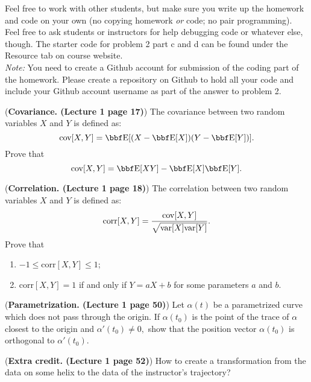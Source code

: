 \documentclass[12pt,letterpaper]{hmcpset}
\begin{document}
Feel free to work with other students, but make sure you write up the homework
and code on your own (no copying homework \textit{or} code; no pair programming).
Feel free to ask students or instructors for help debugging code or whatever else,
though.
The starter code for problem 2 part c and d can be found under the Resource tab on course website.\\

\textit{Note:} You need to create a Github account for submission of the coding part of the homework. Please create a repository on Github to hold all your code and include your Github account username as part of the answer to problem 2.

\begin{problem}[1]
(\textbf{Covariance. (Lecture 1 page 17)}) The covariance between two random variables $X$ and $Y$ is defined as:
$$
   \cov[X,Y] = \EE[(X-\EE[X])(Y-\EE[Y])].
$$
Prove that 
$$
\cov[X,Y] = \EE[XY]- \EE[X] \EE[Y].
$$
\end{problem}
\begin{solution}
    \vfill
\end{solution}
\newpage




\begin{problem}[2]
(\textbf{Correlation. (Lecture 1 page 18)}) The correlation between two random variables $X$ and $Y$ is defined as:
$$
\text{corr}[X,Y] =\frac{ {\hbox{cov}}[X,Y]}{\sqrt{{\hbox{var}}[X]{\hbox{var}}[Y]}}.
$$
Prove that 
\begin{enumerate}
\item $-1\le\text{corr}[X,Y]\le1$;
\item $\text{corr}[X,Y]=1$ if and only if $Y=aX+b$ for some parameters $a$ and $b$.
\end{enumerate}


\end{problem}
\begin{solution}
    \vfill
\end{solution}
\newpage

\begin{problem}[3]
	(\textbf{Parametrization. (Lecture 1 page 50)}) Let $\alpha(t)$ be a parametrized curve which does not pass through the origin. If $\alpha(t_0)$ is the point of the trace of $\alpha$ closest to the origin and $\alpha'(t_0)\neq0,$ show that the position vector $\alpha(t_0)$ is orthogonal to $\alpha'(t_0)$.
	
	
\end{problem}
\begin{solution}
	\vfill
\end{solution}
\newpage



\begin{problem}[4]
	(\textbf{Extra credit. (Lecture 1 page 52)}) How to create a transformation from the data on some helix to the data of the instructor’s trajectory?
	
	
\end{problem}
\begin{solution}
	\vfill
\end{solution}
\newpage
\end{document}

